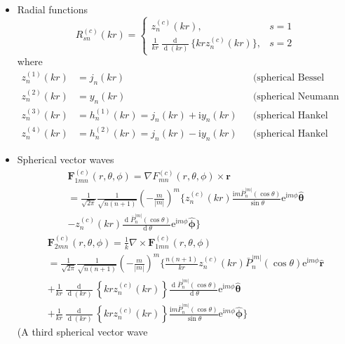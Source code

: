 \documentclass[a4paper,12pt]{article}
\renewcommand{\vec}[1]{\boldsymbol{#1}}
\newcommand{\unitvec}[1]{\hat{\vec{#1}}}
\newcommand{\mrm}[1]{\mathrm{#1}}
\newcommand{\diff}{\operatorname{d}\!}
\newcommand{\iu}{\mrm{i}}
\newcommand{\eu}{\mrm{e}}
\newcommand{\Fv}{\vec{F}}
\newcommand{\rv}{\vec{r}}
\newcommand{\ruv}{\unitvec{r}}
\newcommand{\thetauv}{\unitvec{\theta}}
\newcommand{\phiuv}{\unitvec{\phi}}
\begin{document}
\begin{itemize}
\item Radial functions
  \begin{equation}
    R_{sn}^{(c)}(kr) =
    \begin{cases}
      z_{n}^{(c)}(kr), & s=1 \\
      \frac{1}{kr}\frac{\diff}{\diff(kr)}\{krz_{n}^{(c)}(kr)\}, & s=2
    \end{cases}
  \end{equation}
  where
  \begin{align}
    z_{n}^{(1)}(kr) &= j_{n}(kr) && \text{(spherical Bessel function)} \\
    z_{n}^{(2)}(kr) &= y_{n}(kr) && \text{(spherical Neumann function)} \\
    z_{n}^{(3)}(kr) &= h_{n}^{(1)}(kr) = j_{n}(kr) + \iu y_{n}(kr) && \text{(spherical Hankel function of the first kind)} \\
    z_{n}^{(4)}(kr) &= h_{n}^{(2)}(kr) = j_{n}(kr) - \iu y_{n}(kr) && \text{(spherical Hankel function of the second kind)}     
  \end{align}
\item Spherical vector waves
  \begin{multline}
    \Fv^{(c)}_{1mn}(r,\theta,\phi) = \nabla F_{mn}^{(c)}(r,\theta,\phi)\times\rv \\
    = \frac{1}{\sqrt{2\pi}} \frac{1}{\sqrt{n(n+1)}} \left(-\frac{m}{|m|}\right)^{m} \bigg\{ z_{n}^{(c)}(kr) \frac{\iu m\bar{P}_{n}^{|m|}(\cos\theta)}{\sin\theta} \eu^{\iu m\phi}\thetauv \\
    - z_{n}^{(c)}(kr) \frac{\diff \bar{P}_{n}^{|m|}(\cos\theta)}{\diff\theta} \eu^{\iu m\phi}\phiuv \bigg\}
  \end{multline}
  \begin{multline}
    \Fv^{(c)}_{2mn}(r,\theta,\phi) = \frac{1}{k}\nabla\times\Fv_{1mn}^{(c)}(r,\theta,\phi) \\
    = \frac{1}{\sqrt{2\pi}} \frac{1}{\sqrt{n(n+1)}} \left(-\frac{m}{|m|}\right)^{m} \bigg\{ \frac{n(n+1)}{kr} z_{n}^{(c)}(kr) \bar{P}_{n}^{|m|}(\cos\theta) \eu^{\iu m\phi}\ruv \\
    + \frac{1}{kr}\frac{\diff}{\diff(kr)} \left\{krz_{n}^{(c)}(kr)\right\} \frac{\diff \bar{P}_{n}^{|m|}(\cos\theta)}{\diff\theta} \eu^{\iu m\phi}\thetauv \\
    + \frac{1}{kr}\frac{\diff}{\diff(kr)} \left\{krz_{n}^{(c)}(kr)\right\} \frac{\iu m\bar{P}_{n}^{|m|}(\cos\theta)}{\sin\theta} \eu^{\iu m\phi} \phiuv \bigg\}
  \end{multline}
  (A third spherical vector wave

\end{itemize}
\end{document}
